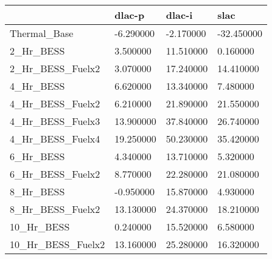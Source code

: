 \begin{tabular}{llll}
\toprule
 & dlac-p & dlac-i & slac \\
\midrule
Thermal_Base & -6.290000 & -2.170000 & -32.450000 \\
2_Hr_BESS & 3.500000 & 11.510000 & 0.160000 \\
2_Hr_BESS_Fuelx2 & 3.070000 & 17.240000 & 14.410000 \\
4_Hr_BESS & 6.620000 & 13.340000 & 7.480000 \\
4_Hr_BESS_Fuelx2 & 6.210000 & 21.890000 & 21.550000 \\
4_Hr_BESS_Fuelx3 & 13.900000 & 37.840000 & 26.740000 \\
4_Hr_BESS_Fuelx4 & 19.250000 & 50.230000 & 35.420000 \\
6_Hr_BESS & 4.340000 & 13.710000 & 5.320000 \\
6_Hr_BESS_Fuelx2 & 8.770000 & 22.280000 & 21.080000 \\
8_Hr_BESS & -0.950000 & 15.870000 & 4.930000 \\
8_Hr_BESS_Fuelx2 & 13.130000 & 24.370000 & 18.210000 \\
10_Hr_BESS & 0.240000 & 15.520000 & 6.580000 \\
10_Hr_BESS_Fuelx2 & 13.160000 & 25.280000 & 16.320000 \\
\bottomrule
\end{tabular}
